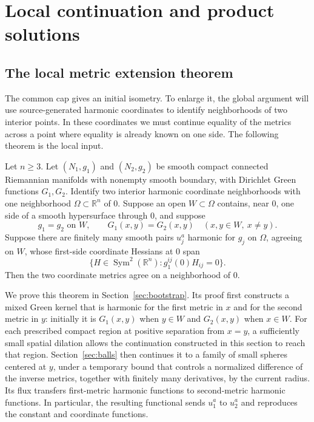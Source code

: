 \section{Local continuation and product solutions}
\label{cross:section}

\subsection{The local metric extension theorem}

The common cap gives an initial isometry. To enlarge it, the global
argument will use source-generated harmonic coordinates to identify
neighborhoods of two interior points. In these coordinates we must
continue equality of the metrics across a point where equality is
already known on one side. The following theorem is the local input.

\begin{theorem}\label{local:extension}
Let $n\geq3$.  Let $(N_1,g_1)$ and $(N_2,g_2)$ be smooth compact
connected Riemannian manifolds with nonempty smooth boundary, with
Dirichlet Green functions $G_1,G_2$.  Identify two interior harmonic
coordinate neighborhoods with one neighborhood $\Omega\subset
\mathbb R^n$ of $0$.  Suppose an open $W\subset\Omega$ contains, near
$0$, one side of a smooth hypersurface through $0$, and suppose
\[
 g_1=g_2\text{ on }W,\qquad
 G_1(x,y)=G_2(x,y)\quad(x,y\in W,\ x\ne y).
\]
Suppose there are finitely many smooth pairs $u_j^a$ harmonic for
$g_j$ on $\Omega$, agreeing on $W$, whose first-side coordinate
Hessians at $0$ span
\[
 \{H\in\operatorname{Sym}^2(\mathbb R^n):g_1^{ij}(0)H_{ij}=0\}.
\]
Then the two coordinate metrics agree on a neighborhood of $0$.
\end{theorem}

We prove this theorem in Section~\ref{sec:bootstrap}. Its proof first
constructs a mixed Green kernel that is harmonic for the first metric in
$x$ and for the second metric in $y$: initially it is $G_1(x,y)$
when $y\in W$ and $G_2(x,y)$ when $x\in W$. For each prescribed
compact region at positive separation from $x=y$, a sufficiently small
spatial dilation allows the continuation constructed in this section to
reach that region. Section~\ref{sec:balls} then continues it to a family
of small spheres centered at $y$, under a temporary bound that controls
a normalized difference of the inverse metrics, together with finitely
many derivatives, by the current radius. Its flux transfers
first-metric harmonic functions to second-metric harmonic functions.
In particular, the resulting functional sends $u_1^a$ to $u_2^a$ and
reproduces the constant and coordinate functions.

